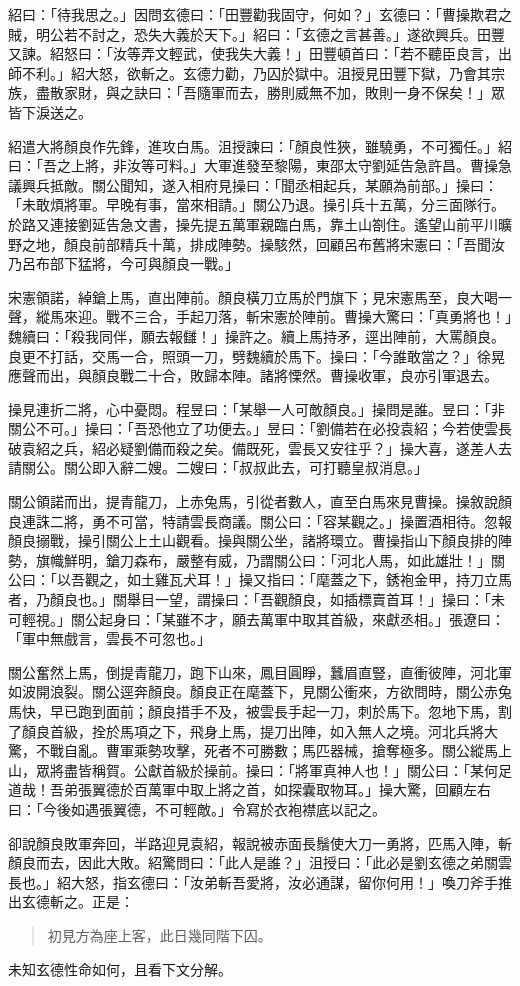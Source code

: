 紹曰：「待我思之。」因問玄德曰：「田豐勸我固守，何如？」玄德曰：「曹操欺君之賊，明公若不討之，恐失大義於天下。」紹曰：「玄德之言甚善。」遂欲興兵。田豐又諫。紹怒曰：「汝等弄文輕武，使我失大義！」田豐頓首曰：「若不聽臣良言，出師不利。」紹大怒，欲斬之。玄德力勸，乃囚於獄中。沮授見田豐下獄，乃會其宗族，盡散家財，與之訣曰：「吾隨軍而去，勝則威無不加，敗則一身不保矣！」眾皆下淚送之。

紹遣大將顏良作先鋒，進攻白馬。沮授諫曰：「顏良性狹，雖驍勇，不可獨任。」紹曰：「吾之上將，非汝等可料。」大軍進發至黎陽，東邵太守劉延告急許昌。曹操急議興兵抵敵。關公聞知，遂入相府見操曰：「聞丞相起兵，某願為前部。」操曰：「未敢煩將軍。早晚有事，當來相請。」關公乃退。操引兵十五萬，分三面隊行。於路又連接劉延告急文書，操先提五萬軍親臨白馬，靠土山劄住。遙望山前平川曠野之地，顏良前部精兵十萬，排成陣勢。操駭然，回顧呂布舊將宋憲曰：「吾聞汝乃呂布部下猛將，今可與顏良一戰。」

宋憲領諾，綽鎗上馬，直出陣前。顏良橫刀立馬於門旗下；見宋憲馬至，良大喝一聲，縱馬來迎。戰不三合，手起刀落，斬宋憲於陣前。曹操大驚曰：「真勇將也！」魏續曰：「殺我同伴，願去報讎！」操許之。續上馬持矛，逕出陣前，大罵顏良。良更不打話，交馬一合，照頭一刀，劈魏續於馬下。操曰：「今誰敢當之？」徐晃應聲而出，與顏良戰二十合，敗歸本陣。諸將慄然。曹操收軍，良亦引軍退去。

操見連折二將，心中憂悶。程昱曰：「某舉一人可敵顏良。」操問是誰。昱曰：「非關公不可。」操曰：「吾恐他立了功便去。」昱曰：「劉備若在必投袁紹；今若使雲長破袁紹之兵，紹必疑劉備而殺之矣。備既死，雲長又安往乎？」操大喜，遂差人去請關公。關公即入辭二嫂。二嫂曰：「叔叔此去，可打聽皇叔消息。」

關公領諾而出，提青龍刀，上赤兔馬，引從者數人，直至白馬來見曹操。操敘說顏良連誅二將，勇不可當，特請雲長商議。關公曰：「容某觀之。」操置酒相待。忽報顏良搦戰，操引關公上土山觀看。操與關公坐，諸將環立。曹操指山下顏良排的陣勢，旗幟鮮明，鎗刀森布，嚴整有威，乃謂關公曰：「河北人馬，如此雄壯！」關公曰：「以吾觀之，如土雞瓦犬耳！」操又指曰：「麾蓋之下，銹袍金甲，持刀立馬者，乃顏良也。」關舉目一望，謂操曰：「吾觀顏良，如插標賣首耳！」操曰：「未可輕視。」關公起身曰：「某雖不才，願去萬軍中取其首級，來獻丞相。」張遼曰：「軍中無戲言，雲長不可忽也。」

關公奮然上馬，倒提青龍刀，跑下山來，鳳目圓睜，蠶眉直豎，直衝彼陣，河北軍如波開浪裂。關公逕奔顏良。顏良正在麾蓋下，見關公衝來，方欲問時，關公赤兔馬快，早已跑到面前；顏良措手不及，被雲長手起一刀，刺於馬下。忽地下馬，割了顏良首級，拴於馬項之下，飛身上馬，提刀出陣，如入無人之境。河北兵將大驚，不戰自亂。曹軍乘勢攻擊，死者不可勝數；馬匹器械，搶奪極多。關公縱馬上山，眾將盡皆稱賀。公獻首級於操前。操曰：「將軍真神人也！」關公曰：「某何足道哉！吾弟張翼德於百萬軍中取上將之首，如探囊取物耳。」操大驚，回顧左右曰：「今後如遇張翼德，不可輕敵。」令寫於衣袍襟底以記之。

卻說顏良敗軍奔回，半路迎見袁紹，報說被赤面長鬚使大刀一勇將，匹馬入陣，斬顏良而去，因此大敗。紹驚問曰：「此人是誰？」沮授曰：「此必是劉玄德之弟關雲長也。」紹大怒，指玄德曰：「汝弟斬吾愛將，汝必通謀，留你何用！」喚刀斧手推出玄德斬之。正是：

\begin{quote}
初見方為座上客，此日幾同階下囚。
\end{quote}

未知玄德性命如何，且看下文分解。
